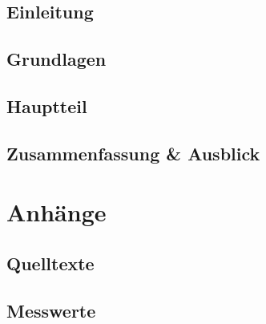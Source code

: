 \documentclass[twoside,a4paper,11pt,openright]{report}
\begin{document}
%
%




\cleardoublepage


\cleardoublepage


\tableofcontents




%
%

\cleardoublepage
{}

\chapter{Einleitung}


\chapter{Grundlagen}

\chapter{Hauptteil}

\chapter{Zusammenfassung \& Ausblick}


%
%

\appendix
\part*{Anhänge}


\chapter{Quelltexte}

\chapter{Messwerte}




\cleardoublepage

\cleardoublepage

\end{document}
